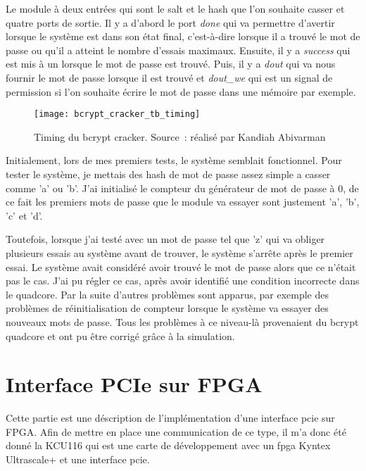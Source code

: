 Le module à deux entrées qui sont le salt et le hash que l'on souhaite casser et quatre ports de sortie.
Il y a d'abord le port \textit{done} qui va permettre d'avertir lorsque le système est dans son état final, c'est-à-dire lorsque il a trouvé le mot de passe ou qu'il a atteint le nombre d'essais maximaux.
Ensuite, il y a \textit{success} qui est mis à un lorsque le mot de passe est trouvé.
Puis, il y a \textit{dout} qui va nous fournir le mot de passe lorsque il est trouvé et \textit{dout\_we} qui est un signal de permission si l'on souhaite écrire le mot de passe dans une mémoire par exemple.

\newpage

\begin{figure}[tbph!]
	\centering
	\texttt{[image: bcrypt\_cracker\_tb\_timing]}
	\caption[Timing du bcrypt cracker]{Timing du bcrypt cracker. Source : réalisé par Kandiah Abivarman}
	\label{fig:bcrypt_cracker_tb_timing}
\end{figure}

Initialement, lors de mes premiers tests, le système semblait fonctionnel. Pour tester le système, je mettais des hash de mot de passe assez simple a casser comme 'a' ou 'b'.
J'ai initialisé le compteur du générateur de mot de passe à 0, de ce fait les premiers mots de passe que le module va essayer sont justement 'a', 'b', 'c' et 'd'.

Toutefois, lorsque j'ai testé avec un mot de passe tel que 'z' qui va obliger plusieurs essais au système avant de trouver, le système s'arrête après le premier essai.
Le système avait considéré avoir trouvé le mot de passe alors que ce n'était pas le cas. J'ai pu régler ce cas, après avoir identifié une condition incorrecte dans le quadcore.
Par la suite d'autres problèmes sont apparus, par exemple des problèmes de réinitialisation de compteur lorsque le système va essayer des nouveaux mots de passe.
Tous les problèmes à ce niveau-là provenaient du bcrypt quadcore et ont pu être corrigé grâce à la simulation.

\newpage

\section{Interface PCIe sur FPGA}

Cette partie est une déscription de l'implémentation d'une interface \gls{pcie} sur FPGA. 
Afin de mettre en place une communication de ce type, il m'a donc été donné la KCU116 qui est une carte de développement avec un \gls{fpga} Kyntex Ultrascale+ et une interface \gls{pcie}.

